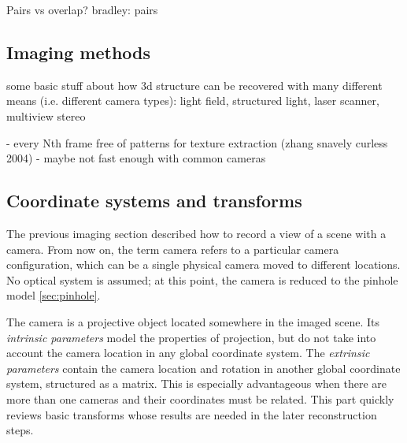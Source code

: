 Pairs vs overlap? bradley: pairs


\subsection{Imaging methods} %


some basic stuff about how 3d structure can be recovered with many different means (i.e. different camera types): light field, structured light, laser scanner, multiview stereo

- every Nth frame free of patterns for texture extraction (zhang snavely curless 2004)
- maybe not fast enough with common cameras


\subsection{Coordinate systems and transforms} %




The previous imaging section described how to record a view of a scene with a camera. From now on, the term camera refers to a particular camera configuration, which can be a single physical camera moved to different locations.
No optical system is assumed; at this point, the camera is reduced to the pinhole model \ref{sec:pinhole}.


The camera is a projective object located somewhere in the imaged scene.
Its \textit{intrinsic parameters} model the properties of projection, but do not take into account the camera location in any global coordinate system.
The \textit{extrinsic parameters} contain the camera location and rotation in another global coordinate system, structured as a matrix.
This is especially advantageous when there are more than one cameras and their coordinates must be related.
\cite{hartley03multiview,heyden2005multiple}
This part quickly reviews basic transforms whose results are needed in the later reconstruction steps.

